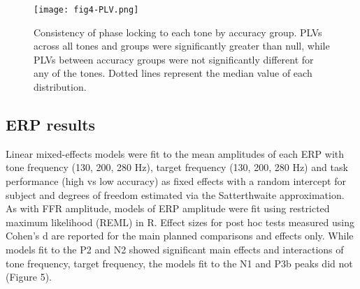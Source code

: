 \documentclass{article}
\begin{document}
\begin{figure}
    \centering
    \texttt{[image: fig4-PLV.png]}
    \caption{Consistency of phase locking to each tone by accuracy group. PLVs across all tones and groups were significantly greater than null, while PLVs between accuracy groups were not significantly different for any of the tones. Dotted lines represent the median value of each distribution.}
    \label{Figure 4}
\end{figure}

\subsection*{ERP results}
Linear mixed-effects models were fit to the mean amplitudes of each ERP with tone frequency (130, 200, 280 Hz), target frequency (130, 200, 280 Hz) and task performance (high vs low accuracy) as fixed effects with a random intercept for subject and degrees of freedom estimated via the Satterthwaite approximation. As with FFR amplitude, models of ERP amplitude were fit using restricted maximum likelihood (REML) in R. Effect sizes for post hoc tests measured using Cohen’s d are reported for the main planned comparisons and effects only. While models fit to the P2 and N2 showed significant main effects and interactions of tone frequency, target frequency, the models fit to the N1 and P3b peaks did not (Figure 5).
\end{document}
